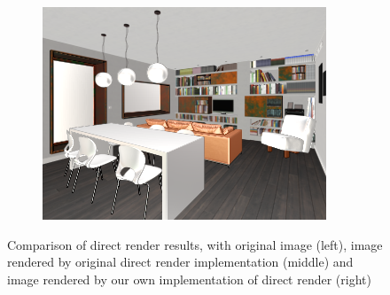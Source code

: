 \begin{figure}[H]
\begin{subfigure}{0.32\linewidth}
        \includegraphics[width=\linewidth]{praca/images/AI45_002_Cam01.direct_ours.png}
    \end{subfigure}
    \caption[Comparison of direct render results]{Comparison of direct render results, with original image (left), image rendered by original direct render implementation (middle) and image rendered by our own implementation of direct render (right)}
    \label{fig:comparison-direct}
\end{figure}
